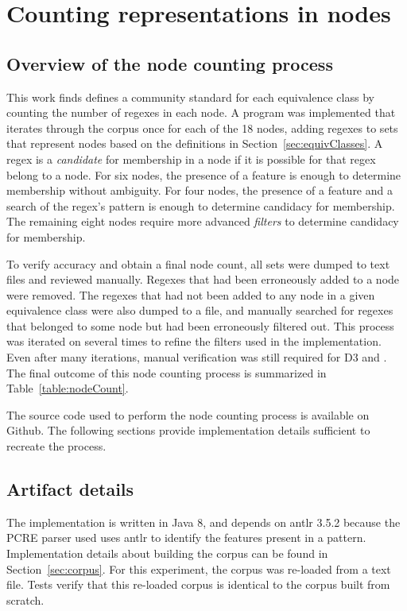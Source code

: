 \section{Counting representations in nodes}

\subsection{Overview of the node counting process}
\label{sec:nodeCountOverview}
This work finds defines a community standard for each equivalence class by counting the number of regexes in each node.  A program was implemented that iterates through the corpus once for each of the 18 nodes, adding regexes to sets that represent nodes based on the definitions in Section~\ref{sec:equivClasses}.  A regex is a \emph{candidate} for membership in a node if it is possible for that regex belong to a node.  For six nodes, the presence of a feature is enough to determine membership without ambiguity.  For four nodes, the presence of a feature and a search of the regex's pattern is enough to determine candidacy for membership.  The remaining eight nodes require more advanced \emph{filters} to determine candidacy for membership.

To verify accuracy and obtain a final node count, all sets were dumped to text files and reviewed manually. Regexes that had been erroneously added to a node were removed.  The regexes that had not been added to any node in a given equivalence class were also dumped to a file, and manually searched for regexes that belonged to some node but had been erroneously filtered out.  This process was iterated on several times to refine the filters used in the implementation.  Even after many iterations, manual verification was still required for D3 and . The final outcome of this node counting process is summarized in Table~\ref{table:nodeCount}.

The source code used to perform the node counting process is available on Github.  The following sections provide implementation details sufficient to recreate the process.

\subsection{Artifact details}
The implementation is written in Java 8, and depends on antlr 3.5.2 because the PCRE parser used uses antlr to identify the features present in a pattern.  Implementation details about building the corpus can be found in Section~\ref{sec:corpus}.  For this experiment, the corpus was re-loaded from a text file.  Tests verify that this re-loaded corpus is identical to the corpus built from scratch.


